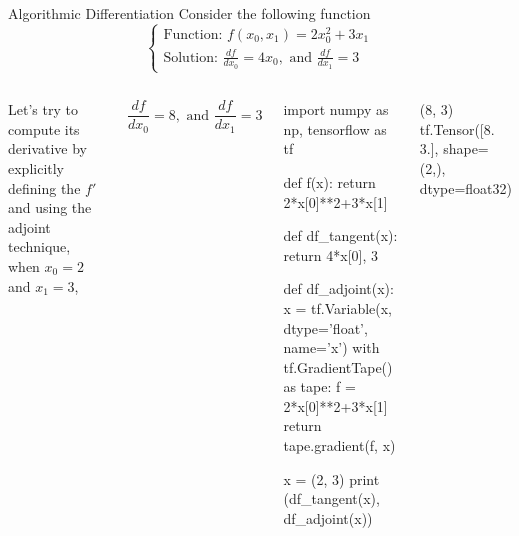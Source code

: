 \documentclass{beamer}
\begin{document}

\begin{frame}[fragile]{Algorithmic Differentiation}
Consider the following function
\begin{equation*}
\begin{cases}
\text{Function: } f(x_0, x_1) = 2x_0^2 + 3x_1\\
\text{Solution: } \frac{df}{dx_0} = 4x_0, \text{ and } \frac{df}{dx_1}=3
\end{cases}
\end{equation*}
\begin{columns}
Let's try to compute its derivative by explicitly defining the $f'$ and using the adjoint technique, when $x_0=2$ and $x_1=3$,

\begin{equation*}
\frac{df}{dx_0} = 8, \text{ and } \frac{df}{dx_1}=3
\end{equation*}
\begin{ipython}
import numpy as np, tensorflow as tf

def f(x):
  return 2*x[0]**2+3*x[1]

def df_tangent(x):
  return 4*x[0], 3

def df_adjoint(x):
  x = tf.Variable(x, dtype='float', name='x')
  with tf.GradientTape() as tape:
    f = 2*x[0]**2+3*x[1]
  return tape.gradient(f, x)

x = (2, 3)
print (df_tangent(x), df_adjoint(x))
\end{ipython}
\begin{ioutput}

(8, 3) tf.Tensor([8. 3.], shape=(2,), dtype=float32)
\end{ioutput}
\end{columns}
\end{frame}
\end{document}
